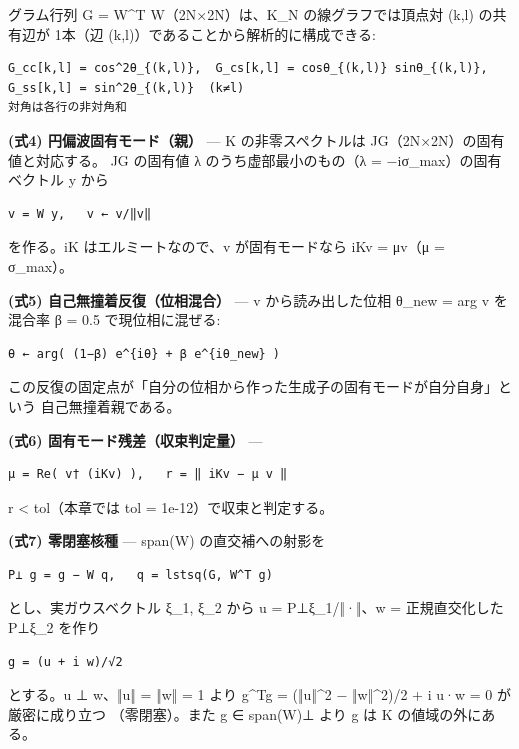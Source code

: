\documentclass[
  a4paper,
]{ltjsarticle}
\begin{document}
グラム行列 G = W\^{}T W（2N×2N）は、K\_N の線グラフでは頂点対 (k,l)
の共有辺が 1本（辺 (k,l)）であることから解析的に構成できる:

\begin{verbatim}
G_cc[k,l] = cos^2θ_{(k,l)},  G_cs[k,l] = cosθ_{(k,l)} sinθ_{(k,l)},  G_ss[k,l] = sin^2θ_{(k,l)}  (k≠l)
対角は各行の非対角和
\end{verbatim}

\textbf{(式4) 円偏波固有モード（親）} --- K の非零スペクトルは
JG（2N×2N）の固有値と対応する。 JG の固有値 λ のうち虚部最小のもの（λ =
−iσ\_max）の固有ベクトル y から

\begin{verbatim}
v = W y,   v ← v/‖v‖
\end{verbatim}

を作る。iK はエルミートなので、v が固有モードなら iKv = μv（μ =
σ\_max）。

\textbf{(式5) 自己無撞着反復（位相混合）} --- v から読み出した位相
θ\_new = arg v を混合率 β = 0.5 で現位相に混ぜる:

\begin{verbatim}
θ ← arg( (1−β) e^{iθ} + β e^{iθ_new} )
\end{verbatim}

この反復の固定点が「自分の位相から作った生成子の固有モードが自分自身」という
自己無撞着親である。

\textbf{(式6) 固有モード残差（収束判定量）} ---

\begin{verbatim}
μ = Re( v† (iKv) ),   r = ‖ iKv − μ v ‖
\end{verbatim}

r \textless{} tol（本章では tol = 1e-12）で収束と判定する。

\textbf{(式7) 零閉塞核種} --- span(W) の直交補への射影を

\begin{verbatim}
P⊥ g = g − W q,   q = lstsq(G, W^T g)
\end{verbatim}

とし、実ガウスベクトル ξ\_1, ξ\_2 から u = P⊥ξ\_1/‖·‖、w =
正規直交化した P⊥ξ\_2 を作り

\begin{verbatim}
g = (u + i w)/√2
\end{verbatim}

とする。u ⊥ w、‖u‖ = ‖w‖ = 1 より g\^{}Tg = (‖u‖\^{}2 − ‖w‖\^{}2)/2 + i
u·w = 0 が厳密に成り立つ （零閉塞）。また g ∈ span(W)⊥ より g は K
の値域の外にある。
\end{document}
